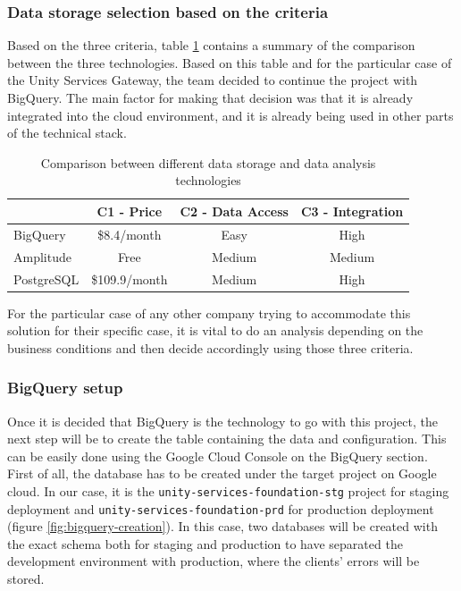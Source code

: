 \documentclass[english, 12pt, a4paper, sci, utf8, a-1b, online]{aaltothesis}
\begin{document}
\subsubsection*{Data storage selection based on the criteria}

Based on the three criteria, table \ref{tab:data-souces} contains a summary of the comparison between the three technologies. Based on this table and for the particular case of the Unity Services Gateway, the team decided to continue the project with BigQuery. The main factor for making that decision was that it is already integrated into the cloud environment, and it is already being used in other parts of the technical stack.\\

\begin{table}[h!]
\centering
\begin{tabular}{|l|c|c|c|}
\hline
           & C1 - Price    & C2 - Data Access & C3 - Integration \\ \hline\hline
BigQuery   & \$8.4/month   & Easy             & High             \\
Amplitude  & Free          & Medium           & Medium           \\
PostgreSQL & \$109.9/month & Medium           & High             \\ \hline 
\end{tabular}
\caption{Comparison between different data storage and data analysis technologies}
\label{tab:data-souces}
\end{table}

For the particular case of any other company trying to accommodate this solution for their specific case, it is vital to do an analysis depending on the business conditions and then decide accordingly using those three criteria.

\subsubsection{BigQuery setup}

Once it is decided that BigQuery is the technology to go with this project, the next step will be to create the table containing the data and configuration. This can be easily done using the Google Cloud Console on the BigQuery section.\\

First of all, the database has to be created under the target project on Google cloud. In our case, it is the \texttt{unity-services-foundation-stg} project for staging deployment and \texttt{unity-services-foundation-prd} for production deployment (figure \ref{fig:bigquery-creation}). In this case, two databases will be created with the exact schema both for staging and production to have separated the development environment with production, where the clients' errors will be stored.
\end{document}
